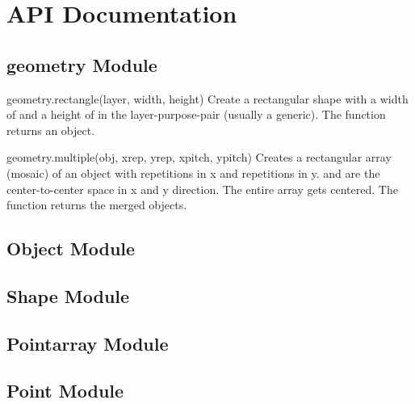 \section{API Documentation}
\subsection{geometry Module}
\begin{apifunc}{geometry.rectangle(layer, width, height)} 
    Create a rectangular shape with a width of  and a height of  in the layer-purpose-pair  (usually a generic). The function
    returns an object.
\end{apifunc}
\begin{apifunc}{geometry.multiple(obj, xrep, yrep, xpitch, ypitch)} 
    Creates a rectangular array (mosaic) of an object with  repetitions in x and  repetitions in y.  and  are the
    center-to-center space in x and y direction. The entire array gets centered. The function returns the merged objects.
\end{apifunc}
\subsection{Object Module}
\subsection{Shape Module}
\subsection{Pointarray Module}
\subsection{Point Module}


